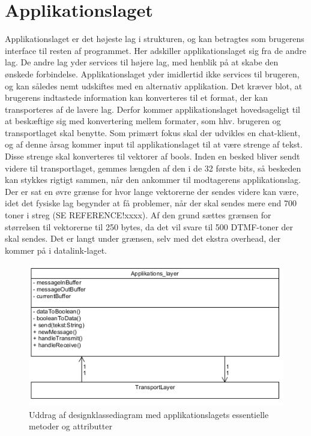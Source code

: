 \section{Applikationslaget}
Applikationslaget er det højeste lag i strukturen, og kan betragtes som brugerens interface til resten af programmet. Her adskiller applikationslaget sig fra de andre lag. De andre lag yder services til højere lag, med henblik på at skabe den ønskede forbindelse. Applikationslaget yder imidlertid ikke services til brugeren, og kan således nemt udskiftes med en alternativ applikation. Det kræver blot, at brugerens indtastede information kan konverteres til et format, der kan transporteres af de lavere lag.
	Derfor kommer applikationslaget hovedsageligt til at beskæftige sig med konvertering mellem formater, som hhv. brugeren og transportlaget skal benytte. Som primært fokus skal der udvikles en chat-klient, og af denne årsag kommer input til applikationslaget til at være strenge af tekst. Disse strenge skal konverteres til vektorer af bools. Inden en besked bliver sendt videre til transportlaget, gemmes længden af den i de 32 første bits, så beskeden kan stykkes rigtigt sammen, når den ankommer til modtagerens applikationslag. Der er sat en øvre grænse for hvor lange vektorerne der sendes videre kan være, idet det fysiske lag begynder at få problemer, når der skal sendes mere end 700 toner i streg (SE REFERENCE!xxxx). Af den grund sættes grænsen for størrelsen til vektorerne til 250 bytes, da det vil svare til 500 DTMF-toner der skal sendes. Det er langt under grænsen, selv med det ekstra overhead, der kommer på i datalink-laget.
	
	
\begin{figure}[h]
\centering
\includegraphics[scale=0.6]{Billeder/ApplicationLayerDesignClass.PNG}
\caption{Uddrag af designklassediagram med applikationslagets essentielle metoder og attributter}
\label{fig:AppLayerDesign}
\end{figure}
	

